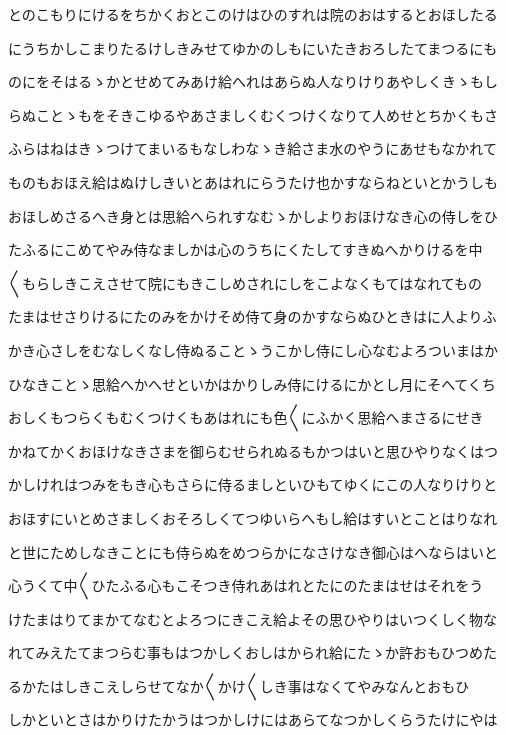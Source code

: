 \documentclass[a4paper,11pt,landscape]{ltjtarticle}
\begin{document}
とのこもりにけるをちかくおとこのけはひのすれは院のおはするとおほしたる
\par\medskip
にうちかしこまりたるけしきみせてゆかのしもにいたきおろしたてまつるにも
\par\medskip
のにをそはるゝかとせめてみあけ給へれはあらぬ人なりけりあやしくきゝもし
\par\medskip
らぬことゝもをそきこゆるやあさましくむくつけくなりて人めせとちかくもさ
\par\medskip
ふらはねはきゝつけてまいるもなしわなゝき給さま水のやうにあせもなかれて
\par\medskip
ものもおほえ給はぬけしきいとあはれにらうたけ也かすならねといとかうしも
\par\medskip
おほしめさるへき身とは思給へられすなむゝかしよりおほけなき心の侍しをひ
\par\medskip
たふるにこめてやみ侍なましかは心のうちにくたしてすきぬへかりけるを中
\par\medskip
〱もらしきこえさせて院にもきこしめされにしをこよなくもてはなれてもの
\par\medskip
たまはせさりけるにたのみをかけそめ侍て身のかすならぬひときはに人よりふ
\par\medskip
かき心さしをむなしくなし侍ぬることゝうこかし侍にし心なむよろついまはか
\par\medskip
ひなきことゝ思給へかへせといかはかりしみ侍にけるにかとし月にそへてくち
\par\medskip
おしくもつらくもむくつけくもあはれにも色〱にふかく思給へまさるにせき
\par\medskip
かねてかくおほけなきさまを御らむせられぬるもかつはいと思ひやりなくはつ
\par\medskip
かしけれはつみをもき心もさらに侍るましといひもてゆくにこの人なりけりと
\par\medskip
おほすにいとめさましくおそろしくてつゆいらへもし給はすいとことはりなれ
\par\medskip
と世にためしなきことにも侍らぬをめつらかになさけなき御心はへならはいと
\par\medskip
心うくて中〱ひたふる心もこそつき侍れあはれとたにのたまはせはそれをう
\par\medskip
けたまはりてまかてなむとよろつにきこえ給よその思ひやりはいつくしく物な
\par\medskip
れてみえたてまつらむ事もはつかしくおしはかられ給にたゝか許おもひつめた
\par\medskip
るかたはしきこえしらせてなか〱かけ〱しき事はなくてやみなんとおもひ
\par\medskip
しかといとさはかりけたかうはつかしけにはあらてなつかしくらうたけにやは
\end{document}
